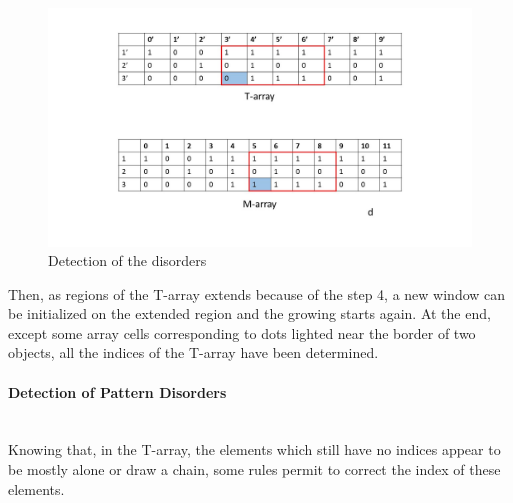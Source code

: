 \begin{figure}[h]
\begin{minipage}[b]{0.50\linewidth}
   \end{minipage}\hfill
   \begin{minipage}[b]{0.50\linewidth}   
      \centering \includegraphics[scale=0.3]{fig/detect4.jpg}
   \end{minipage}
	\caption{Detection of the disorders}
	\label{fig:detect}
\end{figure}


Then, as regions of the T-array extends because of the step 4, a new window can be initialized on the extended region and the growing starts again. At the end, except some array cells corresponding to dots lighted near the border of two objects, all the indices of the T-array have been determined.










\paragraph*{Detection of Pattern Disorders}
~~\\
Knowing that, in the T-array, the elements which still have no indices appear to be mostly alone or draw a chain, some rules permit to correct the index of these elements.

